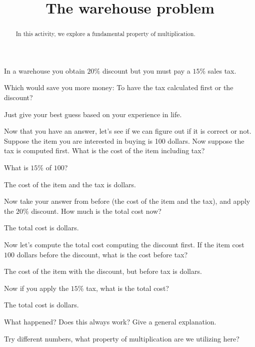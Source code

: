 \documentclass{ximera}
\title{The warehouse problem}
\begin{document}
\begin{abstract}
In this activity, we explore a fundamental property of multiplication. 
\end{abstract}
\maketitle

\begin{question}
In a warehouse you obtain $20\%$ discount but you must pay a $15\%$
sales tax. 


 Which would save you more money: To have the tax calculated
  first or the discount?
\begin{solution}
\begin{free-response}
Just give your best guess based on your experience in life. 
\end{free-response}
\end{solution}
 Now that you have an answer, let's see if we can figure out if
  it is correct or not. Suppose the item you are interested in buying
  is 100 dollars. Now suppose the tax is computed first. What is the
  cost of the item including tax?
\begin{solution}
\begin{hint}
What is $15\%$ of $100$?  
\end{hint}
The cost of the item and the tax is
 dollars. 
\end{solution}
 Now take your answer from before (the cost of the item and the tax),
and apply the $20\%$ discount. How much is the total cost now?
\begin{solution}
The total cost is  dollars. 
\end{solution}
 Now let's compute the total cost computing the discount first. If the
item cost $100$ dollars before the discount, what is the cost before tax?
\begin{solution}
The cost of the item with the discount, but before tax is  dollars. 
\end{solution}
 Now if you apply the $15\%$ tax, what is the total cost?
\begin{solution}
The total cost is  dollars.
\end{solution} 
 What happened? Does this always work? Give a general explanation.
\begin{solution}
\begin{free-response}
Try different numbers, what property of multiplication are we
utilizing here?
\end{free-response}
\end{solution}

\end{question}
\end{document}
